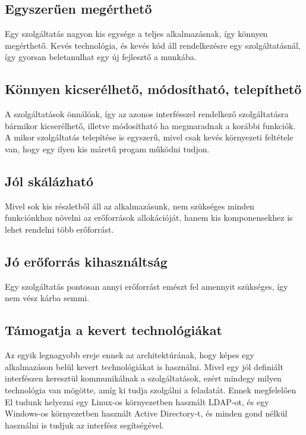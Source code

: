 \documentclass[11pt,magyar,a4paper,oneside,]{report}
\begin{document}
\subsection{Egyszerűen
megérthető}\label{egyszerux171en-meguxe9rthetux151}

Egy szolgáltatás nagyon kis egysége a teljes alkalmazásnak, így könnyen
megérthető. Kevés technológia, és kevés kód áll rendelkezésre egy
szolgáltatásnál, így gyorsan beletanulhat egy új fejlesztő a munkába.

\subsection{Könnyen kicserélhető, módosítható,
telepíthető}\label{kuxf6nnyen-kicseruxe9lhetux151-muxf3dosuxedthatuxf3-telepuxedthetux151}

A szolgáltatások önnálóak, így az azonos interfésszel rendelkező
szolgáltatásra bármikor kicserélhető, illetve módosítható ha megmaradnak
a korábbi funkciók. A mikor szolgáltatás telepítése is egyszerű, mivel
csak kevés környezeti feltétele van, hogy egy ilyen kis máretű progam
működni tudjon.

\subsection{Jól skálázható}\label{juxf3l-skuxe1luxe1zhatuxf3}

Mivel sok kis részletből áll az alkalmazásunk, nem szükséges minden
funkciónkhoz növelni az erőforrások allokációját, hanem kis
komponensekhez is lehet rendelni több erőforrást.

\subsection{Jó erőforrás
kihasználtság}\label{juxf3-erux151forruxe1s-kihasznuxe1ltsuxe1g}

Egy szolgáltatás pontosan annyi erőforrást emészt fel amennyit
szükséges, így nem vész kárba semmi.

\subsection{Támogatja a kevert
technológiákat}\label{tuxe1mogatja-a-kevert-technoluxf3giuxe1kat}

Az egyik legnagyobb ereje ennek az architektúrának, hogy képes egy
alkalmazáson belül kevert technológiákat is használni. Mivel egy jól
definiált interfészen keresztül kommunikálnak a szolgáltatások, ezért
mindegy milyen technológia van mögötte, amíg ki tudja szolgálni a
feladatát. Ennek megfelelően El tudunk helyezni egy Linux-os
környezetben használt LDAP-ot, és egy Windows-os környezetben használt
Active Directory-t, és minden gond nélkül használni is tudjuk az
interfész segítségével.
\end{document}
